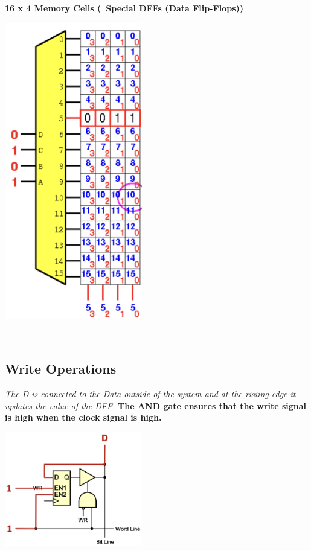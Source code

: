 \begin{minipage}[htp]{0.35\textwidth}
\textbf{16 x 4 Memory Cells (~Special DFFs (Data Flip-Flops))} \\
\begin{center}
    \includegraphics[width=0.45\textwidth]{chapters/chapter1c/images/structure.png}
\end{center}
\end{minipage} \\
\vfill
\begin{minipage}[htp]{0.45\textwidth}   
    \subsection{Write Operations}
    \textit{The D is connected to the Data outside of the system and at the risiing edge it updates the value of the DFF.} \textbf{The AND gate ensures that the write signal is high when the clock signal is high.} \\ \vspace*{5px}
    \begin{center}
        \includegraphics[width=0.45\textwidth]{chapters/chapter1c/images/write.png}
    \end{center}
\end{minipage}
